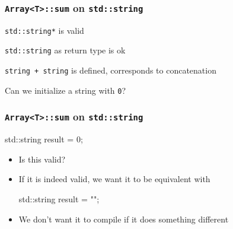 \begin{frame}
  \frametitle{\texttt{Array<T>::sum} on \texttt{std::string}}
  \vskip-5mm
  \begin{overprint}
    \begin{center}
      \texttt{std::string*} is valid
    \end{center}

    \begin{center}
      \texttt{std::string} as return type is ok
    \end{center}

    \begin{center}
      \texttt{string + string} is defined, corresponds to concatenation
    \end{center}

    \begin{center}
      Can we initialize a string with \texttt{0}?
    \end{center}
  \end{overprint}
\end{frame}

\begin{frame}
  \frametitle{\texttt{Array<T>::sum} on \texttt{std::string}}
  \begin{center} \ttfamily
    std::string result = 0;
  \end{center}
  \begin{itemize}
    \item Is this valid?
    \item If it is indeed valid, we want it to be equivalent with
          \begin{center} \ttfamily
            std::string result = "";
          \end{center}
    \item We don't want it to compile if it does something different
  \end{itemize}
\end{frame}

